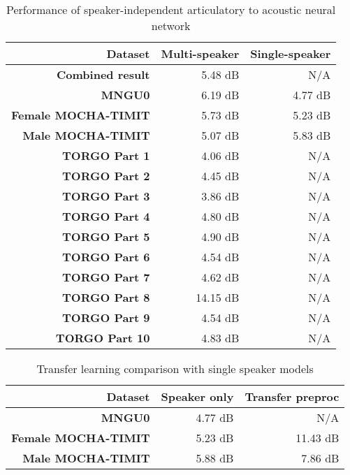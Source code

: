 \documentclass[a4paper]{article}
\begin{document}
\begin{table}[th]
  \caption{Performance of speaker-independent articulatory to acoustic neural network}
  \label{tab:all_data}
  \centering
  \footnotesize

  \begin{tabular}{ r r r }
    \toprule
    \textbf{Dataset} & Multi-speaker & Single-speaker \\
    \midrule
    \textbf{Combined result} & 5.48 dB & N/A \\  
    \midrule
    \textbf{MNGU0} & 6.19 dB & 4.77 dB \\
    \textbf{Female MOCHA-TIMIT} & 5.73 dB & 5.23 dB \\
    \textbf{Male MOCHA-TIMIT} & 5.07 dB & 5.83 dB \\
    \textbf{TORGO Part 1} & 4.06 dB & N/A \\
    \textbf{TORGO Part 2} & 4.45 dB & N/A \\
    \textbf{TORGO Part 3} & 3.86 dB & N/A \\
    \textbf{TORGO Part 4} & 4.80 dB & N/A \\
    \textbf{TORGO Part 5} & 4.90 dB & N/A \\
    \textbf{TORGO Part 6} & 4.54 dB & N/A \\
    \textbf{TORGO Part 7} & 4.62 dB & N/A \\
    \textbf{TORGO Part 8} & 14.15 dB & N/A\\
    \textbf{TORGO Part 9} & 4.54 dB & N/A \\
    \textbf{TORGO Part 10} & 4.83 dB & N/A \\
    \bottomrule
  \end{tabular}
\end{table}


\begin{table}[th]
  \caption{Transfer learning comparison with single speaker models}
  \label{tab:transfer}
  \centering
  \footnotesize

  \begin{tabular}{ r r r}
    \toprule
    \textbf{Dataset} & \textbf{Speaker only} & \textbf{Transfer preproc} \\
    \midrule
    \textbf{MNGU0} & 4.77 dB & N/A \\
    \textbf{Female MOCHA-TIMIT} & 5.23 dB & 11.43 dB \\
    \textbf{Male MOCHA-TIMIT} & 5.88 dB & 7.86 dB \\
    \bottomrule
  \end{tabular}
\end{table}
\end{document}
